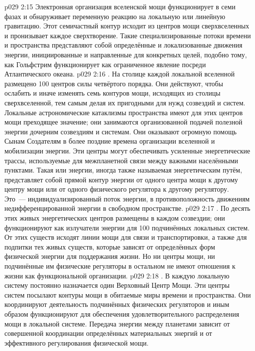 \vs p029 2:15 Электронная организация вселенской мощи функционирует в семи фазах и обнаруживает переменную реакцию на локальную или линейную гравитацию. Этот семичастный контур исходит из центров мощи сверхвселенных и пронизывает каждое сверхтворение. Такие специализированные потоки времени и пространства представляют собой определённые и локализованные движения энергии, инициированные и направленные для конкретных целей, подобно тому, как Гольфстрим функционирует как ограниченное явление посреди Атлантического океана.
\vs p029 2:16 . На столице каждой локальной вселенной размещено 100 центров силы четвёртого порядка. Они действуют, чтобы ослабить и иначе изменять семь контуров мощи, исходящих из столицы сверхвселенной, тем самым делая их пригодными для нужд созвездий и систем. Локальные астрономические катаклизмы пространства имеют для этих центров мощи преходящее значение; они занимаются организованной подачей полезной энергии дочерним созвездиям и системам. Они оказывают огромную помощь Сынам Создателям в более поздние времена организации вселенной и мобилизации энергии. Эти центры могут обеспечивать усиленные энергетические трассы, используемые для межпланетной связи между важными населёнными пунктами. Такая  или  энергии, иногда также называемая энергетическим путём, представляет собой прямой контур энергии от одного центра мощи к другому центру мощи или от одного физического регулятора к другому регулятору. Это~--- индивидуализированный поток энергии, в противоположность движениям недифференцированной энергии в свободном пространстве.
\vs p029 2:17 . По десять этих живых энергетических центров размещены в каждом созвездии; они функционируют как излучатели энергии для 100 подчинённых локальных систем. От этих существ исходят линии мощи для связи и транспортировки, а также для подпитки тех живых существ, которые зависят от определённых форм физической энергии для поддержания жизни. Но ни центры мощи, ни подчинённые им физические регуляторы в остальном не имеют отношения к жизни как функциональной организации.
\vs p029 2:18 . В каждую локальную систему постоянно назначается один Верховный Центр Мощи. Эти центры систем посылают контуры мощи в обитаемые миры времени и пространства. Они координируют деятельность подчинённых физических регуляторов и иным образом функционируют для обеспечения удовлетворительного распределения мощи в локальной системе. Передача энергии между планетами зависит от совершенной координации определённых материальных энергий и от эффективного регулирования физической мощи.
